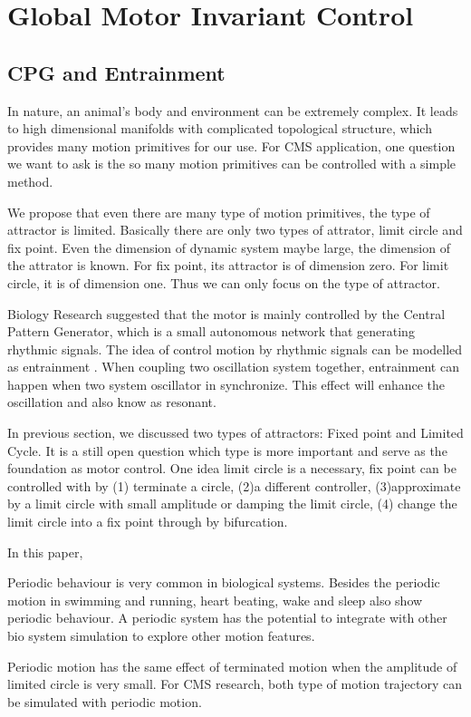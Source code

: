 \section{Global Motor Invariant Control}
\subsection{CPG and Entrainment}
In nature, an animal's body and environment can be extremely complex. 
It leads to high dimensional manifolds with complicated topological structure, which provides many motion primitives for our use.
For CMS application, one question we want to ask is the so many motion primitives can be controlled with a simple method.

We propose that even there are many type of motion primitives, the type of attractor is limited. Basically there are only two types of attrator, limit circle and fix point.
Even the dimension of dynamic system maybe large, the dimension of the attrator is known. 
For fix point, its attractor is of dimension zero.
For limit circle, it is of dimension one.
Thus we can only focus on the type of attractor.



Biology Research suggested that the motor is mainly controlled by the Central Pattern Generator, which is a small autonomous network that generating rhythmic signals.
The idea of control motion by rhythmic signals can be modelled as entrainment \citep{Gonz'alez-Miranda2004}.
When coupling two oscillation system together, entrainment can happen when two system oscillator in synchronize. 
This effect will enhance the oscillation and also know as resonant. 




In previous section, we discussed two types of attractors: Fixed point and Limited Cycle. 
It is a still open question which type is more important and serve as the foundation as motor control\citep{Degallier2010}.
One idea limit circle is a necessary, fix point can be controlled with by 
(1) terminate a circle, 
(2)a different controller, 
(3)approximate by a limit circle with small amplitude or damping the limit circle, 
(4) change the limit circle into a fix point through by bifurcation. 



In this paper, 
\begin{itemize}
\HiItem Periodic behaviour is very common in biological systems. 
Besides the periodic motion in swimming and running, heart beating, wake and sleep also show periodic behaviour.
A periodic system has the potential to integrate with other bio system simulation to explore other motion features.

\HiItem Periodic motion has the same effect of terminated motion when the amplitude of limited circle is very small. 
For CMS research, both type of motion trajectory can be simulated with periodic motion.

\end{itemize}

